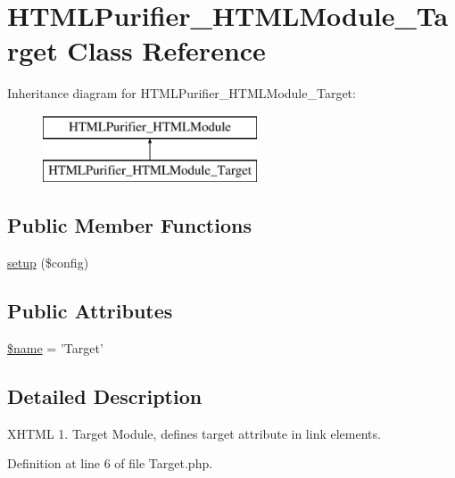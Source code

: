 \hypertarget{classHTMLPurifier__HTMLModule__Target}{\section{H\+T\+M\+L\+Purifier\+\_\+\+H\+T\+M\+L\+Module\+\_\+\+Target Class Reference}
\label{classHTMLPurifier__HTMLModule__Target}
}
Inheritance diagram for H\+T\+M\+L\+Purifier\+\_\+\+H\+T\+M\+L\+Module\+\_\+\+Target\+:\begin{figure}[H]
\begin{center}
\leavevmode
\includegraphics[height=2.000000cm]{classHTMLPurifier__HTMLModule__Target}
\end{center}
\end{figure}
\subsection*{Public Member Functions}
\begin{DoxyCompactItemize}
\item 
\hyperlink{classHTMLPurifier__HTMLModule__Target_ae6d066bf3c635f2f86772a1688d393fb}{setup} (\$config)
\end{DoxyCompactItemize}
\subsection*{Public Attributes}
\begin{DoxyCompactItemize}
\item 
\hyperlink{classHTMLPurifier__HTMLModule__Target_a505cbc4a10c6708d26ff18efedcca5de}{\$name} = 'Target'
\end{DoxyCompactItemize}


\subsection{Detailed Description}
X\+H\+T\+M\+L 1. Target Module, defines target attribute in link elements. 

Definition at line 6 of file Target.\+php.



